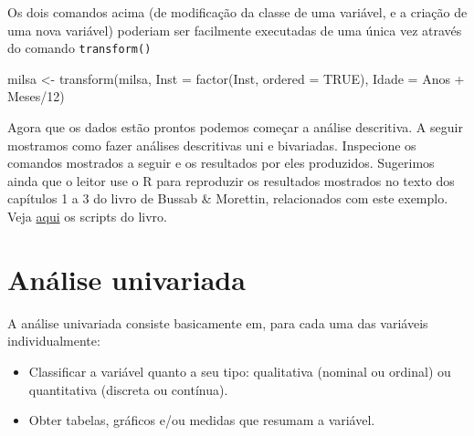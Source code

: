 \documentclass[
  10pt,
  a4paper]{book}
\newenvironment{Shaded}{\begin{snugshade}}{\end{snugshade}}
\newcommand{\AttributeTok}[1]{\textcolor[rgb]{0.77,0.63,0.00}{#1}}
\newcommand{\ConstantTok}[1]{\textcolor[rgb]{0.00,0.00,0.00}{#1}}
\newcommand{\DecValTok}[1]{\textcolor[rgb]{0.00,0.00,0.81}{#1}}
\newcommand{\FunctionTok}[1]{\textcolor[rgb]{0.00,0.00,0.00}{#1}}
\newcommand{\NormalTok}[1]{#1}
\newcommand{\OtherTok}[1]{\textcolor[rgb]{0.56,0.35,0.01}{#1}}
\newcommand{\SpecialCharTok}[1]{\textcolor[rgb]{0.00,0.00,0.00}{#1}}
\providecommand{\tightlist}{%
  \setlength{\itemsep}{0pt}\setlength{\parskip}{0pt}}
\begin{document}
\begin{Shaded}
\end{Shaded}

Os dois comandos acima (de modificação da classe de uma variável, e a
criação de uma nova variável) poderiam ser facilmente executadas de uma
única vez através do comando \texttt{transform()}

\begin{Shaded}
\begin{Highlighting}[]
\NormalTok{milsa }\OtherTok{\textless{}{-}} \FunctionTok{transform}\NormalTok{(milsa,}
                   \AttributeTok{Inst =} \FunctionTok{factor}\NormalTok{(Inst, }\AttributeTok{ordered =} \ConstantTok{TRUE}\NormalTok{),}
                   \AttributeTok{Idade =}\NormalTok{ Anos }\SpecialCharTok{+}\NormalTok{ Meses}\SpecialCharTok{/}\DecValTok{12}\NormalTok{)}
\end{Highlighting}
\end{Shaded}

Agora que os dados estão prontos podemos começar a análise descritiva.
A seguir mostramos como fazer análises descritivas uni e bivariadas.
Inspecione os comandos mostrados a seguir e os resultados por eles
produzidos. Sugerimos ainda que o leitor use o R para reproduzir os
resultados mostrados no texto dos capítulos 1 a 3 do livro de Bussab \&
Morettin, relacionados com este exemplo. Veja \href{https://rpubs.com/EstatBasica/Introd}{aqui}
os scripts do livro.

\hypertarget{anuxe1lise-univariada}{%
\section{Análise univariada}\label{anuxe1lise-univariada}}

A análise univariada consiste basicamente em, para cada uma das
variáveis individualmente:

\begin{itemize}
\tightlist
\item
  Classificar a variável quanto a seu tipo: qualitativa (nominal ou
  ordinal) ou quantitativa (discreta ou contínua).
\item
  Obter tabelas, gráficos e/ou medidas que resumam a variável.
\end{itemize}
\end{document}

